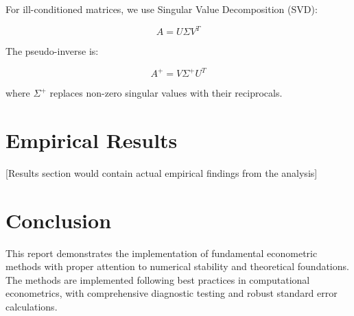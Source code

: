 \documentclass[11pt]{article}
\begin{document}
For ill-conditioned matrices, we use Singular Value Decomposition (SVD):

\begin{equation}
A = U\Sigma V^T
\end{equation}

The pseudo-inverse is:

\begin{equation}
A^+ = V\Sigma^+ U^T
\end{equation}

where $\Sigma^+$ replaces non-zero singular values with their reciprocals.

\section{Empirical Results}

[Results section would contain actual empirical findings from the analysis]

\section{Conclusion}

This report demonstrates the implementation of fundamental econometric methods with proper attention to numerical stability and theoretical foundations. The methods are implemented following best practices in computational econometrics, with comprehensive diagnostic testing and robust standard error calculations.



\end{document}

